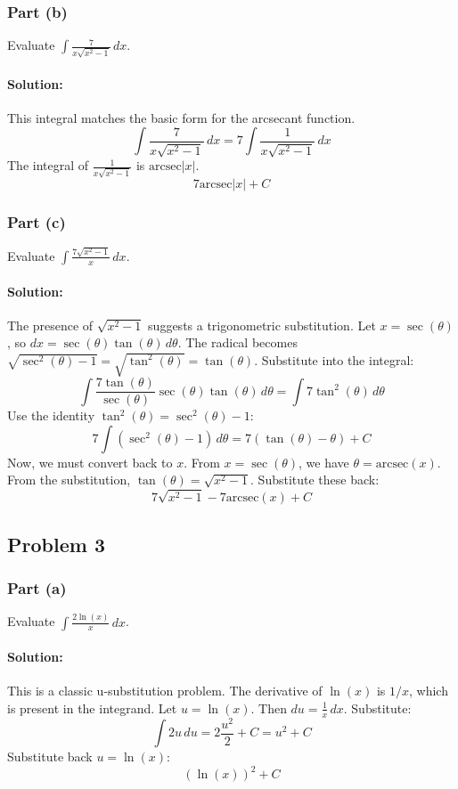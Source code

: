 \documentclass{article}
\begin{document}
\subsubsection*{Part (b)}
Evaluate $\int \frac{7}{x\sqrt{x^2 - 1}} \, dx$.
\paragraph{Solution:} This integral matches the basic form for the arcsecant function.
\[ \int \frac{7}{x\sqrt{x^2 - 1}} \, dx = 7 \int \frac{1}{x\sqrt{x^2 - 1}} \, dx \]
The integral of $\frac{1}{x\sqrt{x^2 - 1}}$ is $\text{arcsec}|x|$.
\[ \boxed{7 \text{arcsec}|x| + C} \]

\subsubsection*{Part (c)}
Evaluate $\int \frac{7\sqrt{x^2 - 1}}{x} \, dx$.
\paragraph{Solution:} The presence of $\sqrt{x^2 - 1}$ suggests a trigonometric substitution. Let $x = \sec(\theta)$, so $dx = \sec(\theta)\tan(\theta) \, d\theta$.
The radical becomes $\sqrt{\sec^2(\theta) - 1} = \sqrt{\tan^2(\theta)} = \tan(\theta)$.
Substitute into the integral:
\[ \int \frac{7\tan(\theta)}{\sec(\theta)} \sec(\theta)\tan(\theta) \, d\theta = \int 7\tan^2(\theta) \, d\theta \]
Use the identity $\tan^2(\theta) = \sec^2(\theta) - 1$:
\[ 7 \int (\sec^2(\theta) - 1) \, d\theta = 7(\tan(\theta) - \theta) + C \]
Now, we must convert back to $x$.
From $x = \sec(\theta)$, we have $\theta = \text{arcsec}(x)$.
From the substitution, $\tan(\theta) = \sqrt{x^2 - 1}$.
Substitute these back:
\[ \boxed{7\sqrt{x^2 - 1} - 7\text{arcsec}(x) + C} \]

\subsection{Problem 3}
\subsubsection*{Part (a)}
Evaluate $\int \frac{2\ln(x)}{x} \, dx$.
\paragraph{Solution:} This is a classic u-substitution problem. The derivative of $\ln(x)$ is $1/x$, which is present in the integrand.
Let $u = \ln(x)$. Then $du = \frac{1}{x} \, dx$.
Substitute:
\[ \int 2u \, du = 2 \frac{u^2}{2} + C = u^2 + C \]
Substitute back $u = \ln(x)$:
\[ \boxed{(\ln(x))^2 + C} \]
\end{document}
